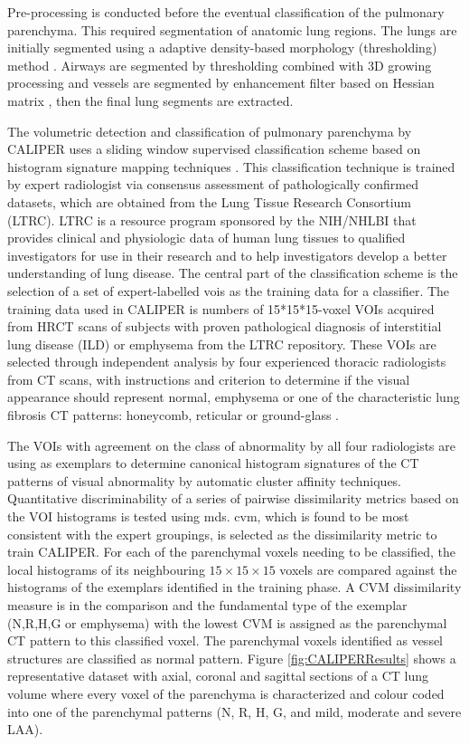 Pre-processing is conducted before the eventual classification of the pulmonary parenchyma. This required segmentation of anatomic lung regions. The lungs are initially segmented using a adaptive density-based morphology (thresholding) method \citep{hu2001automatic}. Airways are segmented by thresholding combined with 3D growing processing and vessels are segmented by enhancement filter based on Hessian matrix \citep{sato2000tissue}, then the final lung segments are extracted. 

The volumetric detection and classification of pulmonary parenchyma by CALIPER uses a sliding window supervised classification scheme based on histogram signature mapping techniques \citep{zavaletta2007high}. This classification technique is trained by expert radiologist via consensus assessment of pathologically confirmed datasets, which are obtained from the Lung Tissue Research Consortium (LTRC). LTRC is a resource program sponsored by the NIH/NHLBI that provides clinical and physiologic data of human lung tissues to qualified investigators for use in their research and to help investigators develop a better understanding of lung disease. The central part of the classification scheme is the selection of a set of expert-labelled \gls{vois} as the training data for a classifier. The training data used in CALIPER is numbers of 15*15*15-voxel VOIs acquired from HRCT scans of subjects with proven pathological diagnosis of interstitial lung disease (ILD) or emphysema from the LTRC repository. These VOIs are selected through independent analysis by four experienced thoracic radiologists from CT scans, with instructions and criterion to determine if the visual appearance should represent normal, emphysema or one of the characteristic lung fibrosis CT patterns: honeycomb, reticular or ground-glass \citep{maldonado2013automated,bartholmai2013quantitative}.

The VOIs with agreement on the class of abnormality by all four radiologists are using as exemplars to determine canonical histogram signatures of the CT patterns of visual abnormality by automatic cluster affinity techniques. Quantitative discriminability of a series of pairwise dissimilarity metrics based on the VOI histograms is tested using \gls{mds}. \gls{cvm}, which is found to be most consistent with the expert groupings, is selected as the dissimilarity metric to train CALIPER. For each of the parenchymal voxels needing to be classified, the local histograms of its neighbouring $15 \times 15 \times 15$ voxels are compared against the histograms of the exemplars identified in the training phase. A CVM dissimilarity measure is in the comparison and the fundamental type of the exemplar (N,R,H,G or emphysema) with the lowest CVM is assigned as the parenchymal CT pattern to this classified voxel. The parenchymal voxels identified as vessel structures are classified as normal pattern. Figure \ref{fig:CALIPERResults} shows a representative dataset with axial, coronal and sagittal sections of a CT lung volume where every voxel of the parenchyma is characterized and colour coded into one of the parenchymal patterns (N, R, H, G, and mild, moderate and severe LAA). 

